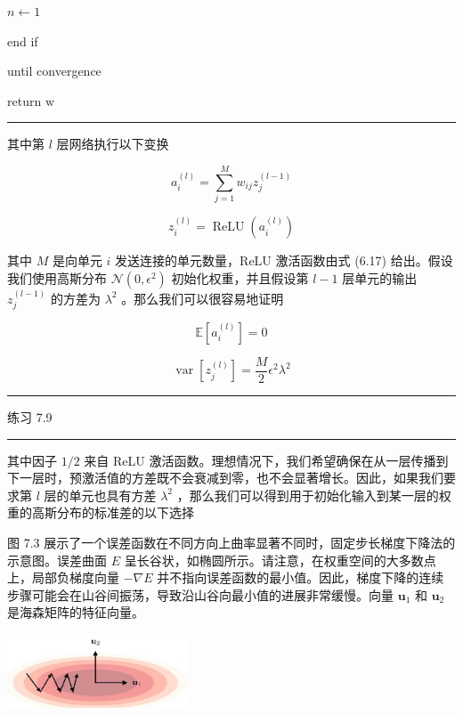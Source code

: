 \documentclass[10pt]{report}
\newcommand{\HRule}{\begin{center}\rule{0.9\linewidth}{0.2mm}\end{center}}
\begin{document}
\hspace*{2em} \(n \leftarrow  1\)

\hspace*{1em} end if

until convergence

return \(\mathrm{w}\)

\HRule

其中第 \(l\) 层网络执行以下变换

\[
{a}_{i}^{\left( l\right) } = \mathop{\sum }\limits_{{j = 1}}^{M}{w}_{ij}{z}_{j}^{\left( l - 1\right) } \tag{7.19}
\]

\[
{z}_{i}^{\left( l\right) } = \operatorname{ReLU}\left( {a}_{i}^{\left( l\right) }\right)  \tag{7.20}
\]

其中 \(M\) 是向单元 \(i\) 发送连接的单元数量，ReLU 激活函数由式 (6.17) 给出。假设我们使用高斯分布 \(\mathcal{N}\left( {0,{\epsilon }^{2}}\right)\) 初始化权重，并且假设第 \(l - 1\) 层单元的输出 \({z}_{j}^{\left( l - 1\right) }\) 的方差为 \({\lambda }^{2}\) 。那么我们可以很容易地证明

\[
\mathbb{E}\left\lbrack  {a}_{i}^{\left( l\right) }\right\rbrack   = 0 \tag{7.21}
\]

\[
\operatorname{var}\left\lbrack  {z}_{j}^{\left( l\right) }\right\rbrack   = \frac{M}{2}{\epsilon }^{2}{\lambda }^{2} \tag{7.22}
\]

\HRule

练习 7.9

\HRule

其中因子 \(1/2\) 来自 ReLU 激活函数。理想情况下，我们希望确保在从一层传播到下一层时，预激活值的方差既不会衰减到零，也不会显著增长。因此，如果我们要求第 \(l\) 层的单元也具有方差 \({\lambda }^{2}\) ，那么我们可以得到用于初始化输入到某一层的权重的高斯分布的标准差的以下选择

图 7.3 展示了一个误差函数在不同方向上曲率显著不同时，固定步长梯度下降法的示意图。误差曲面 \(E\) 呈长谷状，如椭圆所示。请注意，在权重空间的大多数点上，局部负梯度向量 \(- \nabla E\) 并不指向误差函数的最小值。因此，梯度下降的连续步骤可能会在山谷间振荡，导致沿山谷向最小值的进展非常缓慢。向量 \({\mathbf{u}}_{1}\) 和 \({\mathbf{u}}_{2}\) 是海森矩阵的特征向量。

\begin{center}
\includegraphics[max width=0.4\textwidth]{images/0194e279-9b28-703a-88f4-c3ac21e2010d_237_972_355_573_237_0.jpg}
\end{center}
\hspace*{3em} 
\end{document}
